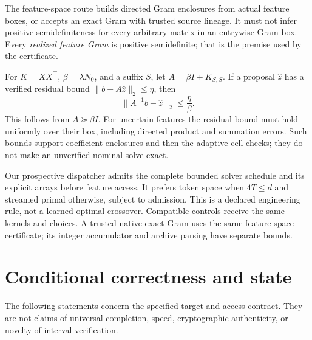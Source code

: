 \documentclass[10pt,twocolumn,letterpaper]{article}
\begin{document}
The feature-space route builds directed Gram enclosures from actual feature
boxes, or accepts an exact Gram with trusted source lineage. It must not infer
positive semidefiniteness for every arbitrary matrix in an entrywise Gram box.
Every \emph{realized feature Gram} is positive semidefinite; that is the premise
used by the certificate.

For $K=XX^\top$, $\beta=\lambda N_0$, and a suffix $S$, let
$A=\beta I+K_{S,S}$. If a proposal $\widehat z$ has a verified residual bound
$\|b-A\widehat z\|_2\leq\eta$, then
\begin{equation}
 \|A^{-1}b-\widehat z\|_2\leq\frac{\eta}{\beta}.
 \label{eq:residual}
\end{equation}
This follows from $A\succeq\beta I$. For uncertain features the residual bound
must hold uniformly over their box, including directed product and summation
errors. Such bounds support coefficient enclosures and then the adaptive cell
checks; they do not make an unverified nominal solve exact.

Our prospective dispatcher admits the complete bounded solver schedule and its
explicit arrays before feature access. It prefers token space when $4T\leq d$
and streamed primal otherwise, subject to admission. This is a declared
engineering rule, not a learned optimal crossover. Compatible controls receive
the same kernels and choices. A trusted native exact Gram uses the same
feature-space certificate; its integer accumulator and archive parsing have
separate bounds.

\section{Conditional correctness and state}
The following statements concern the specified target and access contract. They
are not claims of universal completion, speed, cryptographic authenticity, or
novelty of interval verification.
\end{document}
